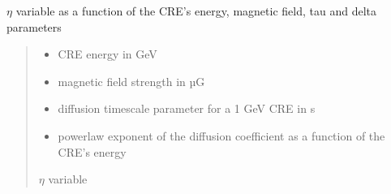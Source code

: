 \documentclass[letterpaper,10pt,english]{sphinxmanual}
\begin{document}

\begin{fulllineitems}
\label{\detokenize{diffsph.spectra:diffsph.spectra.synchrotron.eta}}
\pysigstartsignatures
{}
\pysigstopsignatures
\sphinxAtStartPar
\(\eta\) variable as a function of the CRE’s energy, magnetic field, tau and delta parameters
\begin{quote}\begin{description}
\begin{itemize}
\item {} 
\sphinxAtStartPar
{} \textendash{} CRE energy in GeV

\item {} 
\sphinxAtStartPar
{} \textendash{} magnetic field strength in µG

\item {} 
\sphinxAtStartPar
{} \textendash{} diffusion time\sphinxhyphen{}scale parameter for a 1 GeV CRE in s

\item {} 
\sphinxAtStartPar
{} \textendash{} power\sphinxhyphen{}law exponent of the diffusion coefficient as a function of the CRE’s energy

\end{itemize}

\sphinxAtStartPar
\(\eta\) variable

\end{description}\end{quote}

\end{fulllineitems}

\end{document}
